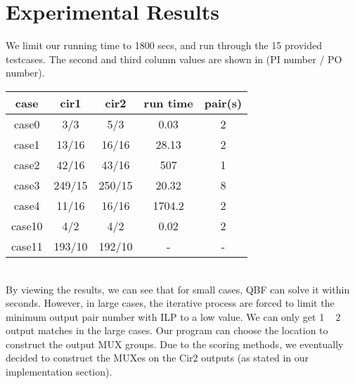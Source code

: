 \section{Experimental Results}

We limit our running time to 1800 secs, and run through the 15 provided testcases. The second and third column values are shown in (PI number / PO number).\\

\begin{tabular}{|c|c|c|c|c|}
\hline
case & cir1 & cir2 & run time & pair(s) \\
\hline
case0 & 3/3 & 5/3 & 0.03 & 2 \\
\hline
case1 & 13/16 & 16/16 & 28.13 & 2 \\
\hline
case2 & 42/16 & 43/16 & 507 & 1 \\
\hline
case3 & 249/15 & 250/15 & 20.32 & 8 \\
\hline
case4 & 11/16 & 16/16 & 1704.2 & 2 \\
\hline
case10 & 4/2 & 4/2 & 0.02 & 2 \\
\hline
case11 & 193/10 & 192/10 & - & - \\
\hline
\end{tabular}
\\

By viewing the results, we can see that for small cases, QBF can solve it within seconds. However, in large cases, the iterative process are forced to limit the minimum output pair number with ILP to a low value. We can only get 1 ~ 2 output matches in the large cases.
Our program can choose the location to construct the output MUX groups. Due to the scoring methods, we eventually decided to construct the MUXes on the Cir2 outputs (as stated in our implementation section).



